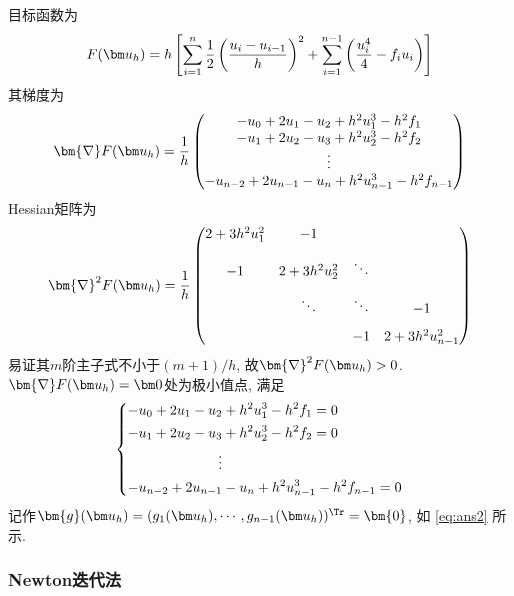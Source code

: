 \documentclass{nedsart}
\begin{document}
目标函数为
\begin{equation}
    F(\uh) = h \left[ \sum^n_{i=1} {\frac{1}{2} \left( \frac{u_i - u_{i-1}}{h} \right)^2} + \sum^{n-1}_{i=1} {  \left( \frac{u^4_i}{4} - f_i u_i \right)} \right]
\end{equation}
其梯度为
\begin{equation}
    \bm{\nabla} F(\uh) = \frac{1}{h}
    \begin{pmatrix}
        - u_0 + 2 u_1 - u_2 + h^2 u_1^3 - h^2 f_1  \\
        - u_1 + 2 u_2 - u_3 + h^2 u_2^3 - h^2 f_2  \\
        \vdots \\
        - u_{n-2} + 2 u_{n-1} - u_n + h^2 u_{n-1}^3 - h^2 f_{n-1} \\
    \end{pmatrix}
\end{equation}
Hessian矩阵为
\begin{equation}
    \bm{\nabla}^2 F(\uh) = \frac{1}{h} 
    \begin{pmatrix}
        2 + 3 h^2 u_1^2 & -1 & & \\[8pt]
        -1 & 2 + 3 h^2 u_2^2 & \ddots & \\[8pt]
        & \ddots & \ddots & -1 \\[8pt]
        & & -1 & 2 + 3 h^2 u_{n-1}^2
    \end{pmatrix}  
\end{equation}
易证其$m$阶主子式不小于$(m+1)/h$, 故$\bm{\nabla}^2 F(\uh)>0$. $\bm{\nabla} F(\uh) = \bm0$处为极小值点, 满足
\begin{equation}
    \begin{dcases}
        - u_0 + 2 u_1 - u_2 + h^2 u_1^3 - h^2 f_1 = 0 \\
        - u_1 + 2 u_2 - u_3 + h^2 u_2^3 - h^2 f_2 = 0\\
        \hspace{6.5em} \vdots \\
        - u_{n-2} + 2 u_{n-1} - u_n + h^2 u_{n-1}^3 - h^2 f_{n-1} = 0\\
    \end{dcases}
\end{equation}
记作$\bm{g}(\uh) = (g_1(\uh), \cdots, g_{n-1}(\uh))^\Tr = \bm{0}$, 如 \eqref{eq:ans2} 所示.

\subsubsection{Newton迭代法}
\end{document}
